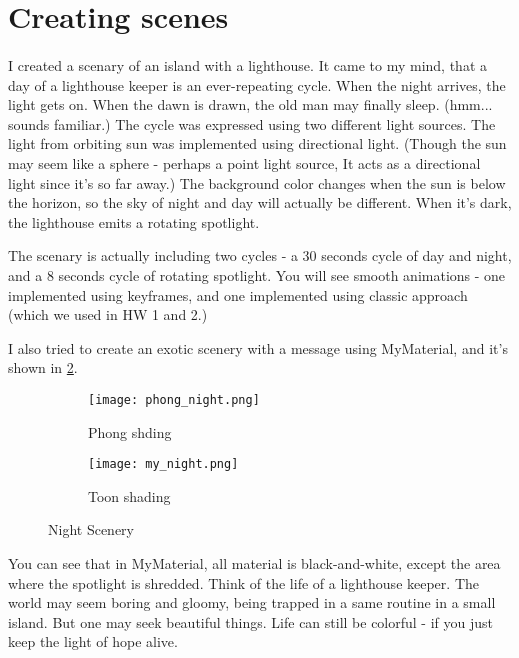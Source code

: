 \documentclass[10pt,a4paper]{article}
\begin{document}
	
	\section{Creating scenes}
	\paragraph{}	
	I created a scenary of an island with a lighthouse. It came to my mind, that a day of a lighthouse keeper is an ever-repeating cycle. When the night arrives, the light gets on. When the dawn is drawn, the old man may finally sleep. (hmm... sounds familiar.) The cycle was expressed using two different light sources. The light from orbiting sun was implemented using directional light. (Though the sun may seem like a sphere - perhaps a point light source, It acts as a directional light since it's so far away.) The background color changes when the sun is below the horizon, so the sky of night and day will actually be different. When it's dark, the lighthouse emits a rotating spotlight.
	
	The scenary is actually including two cycles - a 30 seconds cycle of day and night, and a 8 seconds cycle of rotating spotlight. You will see smooth animations - one implemented using keyframes, and one implemented using classic approach (which we used in HW 1 and 2.)
	
	I also tried to create an exotic scenery with a message using MyMaterial, and it's shown in \ref{fig:my}.
	\begin{figure}[h]
		\begin{subfigure}{0.5\linewidth}
			\centering
			\texttt{[image: phong\_night.png]}
			\caption{Phong shding}
			\label{fig:phong2}
		\end{subfigure}
		\begin{subfigure}{0.5\linewidth}
			\centering
			\texttt{[image: my\_night.png]}
			\caption{Toon shading}
			\label{fig:my}
		\end{subfigure}
		\caption{Night Scenery}
		\label{fig:scene}
	\end{figure}

	You can see that in MyMaterial, all material is black-and-white, except the area where the spotlight is shredded. Think of the life of a lighthouse keeper. The world may seem boring and gloomy, being trapped in a same routine in a small island. But one may seek beautiful things. Life can still be colorful - if you just keep the light of hope alive.
	
\end{document}
